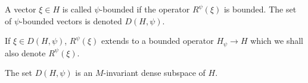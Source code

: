 \begin{definition}
    A vector $\xi\in H$ is called $\psi$-bounded if the operator $R^\psi(\xi)$ is bounded. The set of $\psi$-bounded vectors is denoted $D(H,\psi)$.
\end{definition}
\begin{notation}
    If $\xi\in D(H,\psi)$, $R^\psi(\xi)$ extends to a bounded operator $H_\psi\to H$ which we shall also denote $R^\psi(\xi)$.
\end{notation}
\begin{proposition}
    The set $D(H,\psi)$ is an $M$-invariant dense subspace
    of $H$.
\end{proposition}
% 